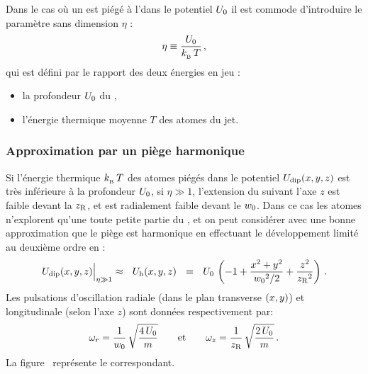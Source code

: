 Dans le cas où un \nat est piégé à l'\eqthdy dans le potentiel ${{U_0}}$ il est commode d'introduire le paramètre sans dimension $\eta$ %
%
:
\begin{equation}
	\eta
	 \equiv \dfrac{\Uprof}{\kb\,T}
	 \virguleformule
	\label{eq:EtaPD}
\end{equation}
qui est défini par le rapport des deux énergies en jeu :
\begin{itemize}
	\item la profondeur ${{U_0}}$ du \pd,
	\item l'énergie thermique moyenne $T$ des atomes du jet.
\end{itemize} 

\subsubsection{Approximation par un piège harmonique}
Si l'énergie thermique ${k_{_{\rm B}}}\,T$ des atomes piégés dans le potentiel ${U_{\rm dip}(x,y,z)}$ est très inférieure à la profondeur ${{U_0}}$, \cad si $\eta\gg1$, l'extension du \nat suivant l'axe $z$ est faible devant la \ldr ${z_{\rm R}}$, et est radialement faible devant le \waist ${w_0}$. Dans ce cas les atomes n'explorent qu'une toute petite partie du \pp, et on peut considérer avec une bonne approximation que le piège est harmonique en effectuant le développement limité au deuxième ordre en \xyz:
\begin{equation}
	\Avec{\Udipxyz}{\eta\gg1} \approx ~~ \Udiphxyz ~~ \equiv ~~ \Uprof\,\left( -1+\dfrac{x^2+y^2}{\ttfrac{\wzero^2}{2}}+\dfrac{z^2}{\zR^2} \right)
	\pointformule
	\label{eq:Udiphxyz}
\end{equation}%
%
Les pulsations d'oscillation radiale (dans le plan transverse $(x,y)$) et longitudinale (selon l'axe $z$) sont données respectivement par:
\begin{equation}
	\PulsTrans = \frac{1}{\wzero}\,\sqrt{\dfrac{4\,\Uprof}{m}}
	\mbox{~~~~~~et~~~~~~} 
	\PulsLong = \frac{1}{\zR}\,\sqrt{\dfrac{2\,\Uprof}{m}}
	\pointformule
	\label{eq:FreqUdiphxyz}
\end{equation}
La figure~ représente le \pphar correspondant. 
